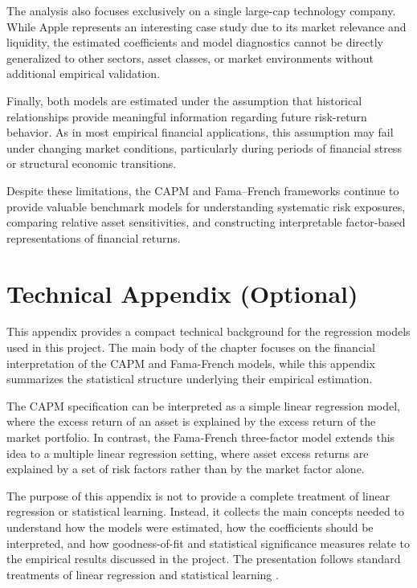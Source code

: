 \documentclass[
  12pt,
  letterpaper,
]{book}
\begin{document}
The analysis also focuses exclusively on a single large-cap technology
company. While Apple represents an interesting case study due to its
market relevance and liquidity, the estimated coefficients and model
diagnostics cannot be directly generalized to other sectors, asset
classes, or market environments without additional empirical validation.

Finally, both models are estimated under the assumption that historical
relationships provide meaningful information regarding future
risk-return behavior. As in most empirical financial applications, this
assumption may fail under changing market conditions, particularly
during periods of financial stress or structural economic transitions.

Despite these limitations, the CAPM and Fama--French frameworks continue
to provide valuable benchmark models for understanding systematic risk
exposures, comparing relative asset sensitivities, and constructing
interpretable factor-based representations of financial returns.

\section{Technical Appendix
(Optional)}\label{technical-appendix-optional}

This appendix provides a compact technical background for the regression
models used in this project. The main body of the chapter focuses on the
financial interpretation of the CAPM and Fama-French models, while this
appendix summarizes the statistical structure underlying their empirical
estimation.

The CAPM specification can be interpreted as a simple linear regression
model, where the excess return of an asset is explained by the excess
return of the market portfolio. In contrast, the Fama-French
three-factor model extends this idea to a multiple linear regression
setting, where asset excess returns are explained by a set of risk
factors rather than by the market factor alone.

The purpose of this appendix is not to provide a complete treatment of
linear regression or statistical learning. Instead, it collects the main
concepts needed to understand how the models were estimated, how the
coefficients should be interpreted, and how goodness-of-fit and
statistical significance measures relate to the empirical results
discussed in the project. The presentation follows standard treatments
of linear regression and statistical learning
.
\end{document}
